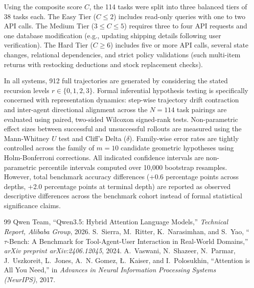 \documentclass[a4paper, 12pt]{report}
\begin{document}
Using the composite score $C$, the 114 tasks were split into three balanced tiers of 38 tasks each. The Easy Tier ($C \le 2$) includes read-only queries with one to two API calls. The Medium Tier ($3 \le C \le 5$) requires three to four API requests and one database modification (e.g., updating shipping details following user verification). The Hard Tier ($C \ge 6$) includes five or more API calls, several state changes, relational dependencies, and strict policy validations (such multi-item returns with restocking deductions and stock replacement checks).

In all systems, 912 full trajectories are generated by considering the stated recursion levels $r \in \{0, 1, 2, 3\}$. Formal inferential hypothesis testing is specifically concerned with representation dynamics: step-wise trajectory drift contraction and inter-agent directional alignment across the $N = 114$ task pairings are evaluated using paired, two-sided Wilcoxon signed-rank tests. Non-parametric effect sizes between successful and unsuccessful rollouts are measured using the Mann-Whitney $U$ test and Cliff's Delta ($\delta$). Family-wise error rates are tightly controlled across the family of $m = 10$ candidate geometric hypotheses using Holm-Bonferroni corrections. All indicated confidence intervals are non-parametric percentile intervals computed over 10,000 bootstrap resamples. However, total benchmark accuracy differences (+0.6 percentage points across depths, +2.0 percentage points at terminal depth) are reported as observed descriptive differences across the benchmark cohort instead of formal statistical significance claims.

\ifdefined\isincluded
\else
\begin{thebibliography}{99}
 Qwen Team, ``Qwen3.5: Hybrid Attention Language Models,'' \emph{Technical Report, Alibaba Group}, 2026.
 S.~Sierra, M.~Ritter, K.~Narasimhan, and S.~Yao, ``$\tau$-Bench: A Benchmark for Tool-Agent-User Interaction in Real-World Domains,'' \emph{arXiv preprint arXiv:2406.12045}, 2024.
 A.~Vaswani, N.~Shazeer, N.~Parmar, J.~Uszkoreit, L.~Jones, A.~N. Gomez, {\L}.~Kaiser, and I.~Polosukhin, ``Attention is All You Need,'' in \emph{Advances in Neural Information Processing Systems (NeurIPS)}, 2017.
\end{thebibliography}
\end{document}
